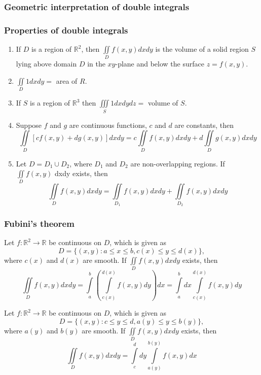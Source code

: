 \documentclass[12pt]{article}
\begin{document}
		\subsubsection{Geometric interpretation of double integrals}
		
		\subsubsection{Properties of double integrals}
		\begin{enumerate}
			\item If $D$ is a region of $\mathbb{R}^2$, then $\iint\limits_D f(x,y) dxdy$ is the volume of a solid region $S$ lying above domain $D$ in the $xy$-plane and below the surface $z=f(x,y)$.
			\item $\iint\limits_D 1 dxdy = $ area of $R$.
			\item If $S$ is a region of $\mathbb{R}^3$ then $\iiint\limits_S 1 dxdydz = $ volume of $S$.
			\item Suppose $f$ and $g$ are continuous functions, $c$ and $d$ are constants, then
					\[
						\iint\limits_D [ cf(x,y) + dg(x,y)] dxdy = c \iint\limits_D f(x,y) dxdy + d \iint\limits_D g(x,y) dxdy
					\]
			\item Let $D = D_1 \cup D_2$, where $D_1$ and $D_2$ are non-overlapping regions. If $\iint\limits_D f(x,y)$ dxdy exists, then
					\[
						\iint\limits_D f(x,y) dxdy = \iint\limits_{D_1} f(x,y) dxdy + \iint\limits_{D_2} f(x,y) dxdy
					\]
		\end{enumerate}
		
		\subsubsection{Fubini's theorem}
		\begin{thm}
			Let $f:\mathbb{R}^2 \to \mathbb{R}$ be continuous on $D$, which is given as
			\[
				D = \{(x,y): a \leq x \leq b, c(x) \leq y \leq d(x)\},
			\]
			where $c(x)$ and $d(x)$ are smooth. If $\iint\limits_D f(x,y) dxdy$ exists, then
			\[
				\iint\limits_D f(x,y) dxdy = \int\limits_a^b \left( \int\limits_{c(x)}^{d(x)} f (x,y) dy \right) dx = \int\limits_a^b dx \int\limits_{c(x)}^{d(x)} f (x,y) dy
			\]
		\end{thm}
		
		\begin{thm}
			Let $f:\mathbb{R}^2 \to \mathbb{R}$ be continuous on $D$, which is given as
			\[
				D = \{(x,y): c \leq y \leq d, a(y) \leq y \leq b(y)\},
			\]
			where $a(y)$ and $b(y)$ are smooth. If $\iint\limits_D f(x,y) dxdy$ exists, then
			\[
				\iint\limits_D f(x,y) dxdy = \int\limits_c^d dy \int\limits_{a(y)}^{b(y)} f (x,y) dx
			\]
		\end{thm}
		
\end{document}
